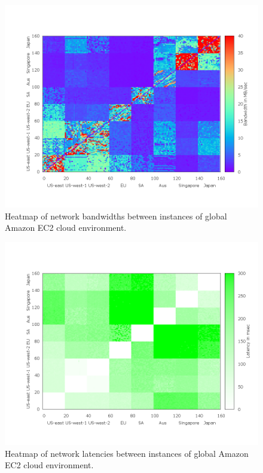 \documentclass{sig-alternate}
\begin{document}
\begin{figure}[htb]
\begin{center}
\includegraphics[width=\linewidth]{plots/bwheatmap.png}
\caption{Heatmap of network bandwidths between instances of global Amazon EC2 cloud environment.
\label{fig_bw}
}
\end{center}
\end{figure}
%
\begin{figure}[htb]
\begin{center}
\includegraphics[width=\linewidth]{plots/latheatmap.png}
\caption{Heatmap of network latencies between instances of global Amazon EC2 cloud environment.
\label{fig_lat}
}
\end{center}
\end{figure}
\end{document}
